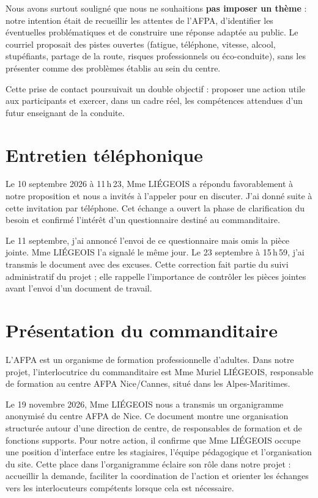Nous avons surtout souligné que nous ne souhaitions \textbf{pas imposer un thème} : notre intention était de recueillir les attentes de l'AFPA, d'identifier les éventuelles problématiques et de construire une réponse adaptée au public. Le courriel proposait des pistes ouvertes (fatigue, téléphone, vitesse, alcool, stupéfiants, partage de la route, risques professionnels ou éco-conduite), sans les présenter comme des problèmes établis au sein du centre.

Cette prise de contact poursuivait un double objectif : proposer une action utile aux participants et exercer, dans un cadre réel, les compétences attendues d'un futur enseignant de la conduite.

\section{Entretien téléphonique}
Le 10 septembre 2026 à 11\,h\,23, Mme LIÉGEOIS a répondu favorablement à notre proposition et nous a invités à l'appeler pour en discuter. J'ai donné suite à cette invitation par téléphone. Cet échange a ouvert la phase de clarification du besoin et confirmé l'intérêt d'un questionnaire destiné au commanditaire.

Le 11 septembre, j'ai annoncé l'envoi de ce questionnaire mais omis la pièce jointe. Mme LIÉGEOIS l'a signalé le même jour. Le 23 septembre à 15\,h\,59, j'ai transmis le document avec des excuses. Cette correction fait partie du suivi administratif du projet ; elle rappelle l'importance de contrôler les pièces jointes avant l'envoi d'un document de travail.

\section{Présentation du commanditaire}
L'AFPA est un organisme de formation professionnelle d'adultes. Dans notre projet, l'interlocutrice du commanditaire est Mme Muriel LIÉGEOIS, responsable de formation au centre AFPA Nice/Cannes, situé dans les Alpes-Maritimes.


Le 19 novembre 2026, Mme LIÉGEOIS nous a transmis un organigramme anonymisé du centre AFPA de Nice. Ce document montre une organisation structurée autour d'une direction de centre, de responsables de formation et de fonctions supports. Pour notre action, il confirme que Mme LIÉGEOIS occupe une position d'interface entre les stagiaires, l'équipe pédagogique et l'organisation du site. Cette place dans l'organigramme éclaire son rôle dans notre projet : accueillir la demande, faciliter la coordination de l'action et orienter les échanges vers les interlocuteurs compétents lorsque cela est nécessaire.

